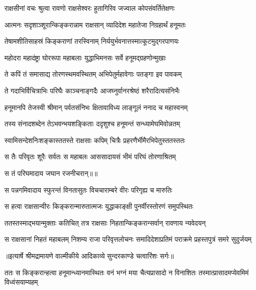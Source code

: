 \twolineshloka
{राक्षसीनां वचः श्रुत्वा रावणो राक्षसेश्वरः}
{हुतागिरिव जज्वाल कोपसंवर्तितेक्षणः} %

\twolineshloka
{आत्मनः सदृशाञ्शूरान्किङ्करान्नाम राक्षसान्}
{व्यादिदेश महातेजा निग्रहार्थं हनूमतः} %

\twolineshloka
{तेषामशीतिसाहस्रं किङ्कराणां तरस्विनाम्}
{निर्ययुर्भवनात्तस्मात्कूटमुद्गरपाणयः} %

\twolineshloka
{महोदरा महादंष्ट्रा घोररूपा महाबलाः}
{युद्धाभिमनसः सर्वे हनूमद्ग्रहणोन्मुखाः} %

\twolineshloka
{ते कपिं तं समासाद्य तोरणस्थमवस्थितम्}
{अभिपेतुर्महावेगाः पतङ्गा इव पावकम्} %

\twolineshloka
{ते गदाभिर्विचित्राभिः परिघैः काञ्चनाङ्गदैः}
{आजघ्नुर्वानरश्रेष्ठं शरैरादित्यसंनिभैः} %

\twolineshloka
{हनूमानपि तेजस्वी श्रीमान् पर्वतसंनिभः}
{क्षितावाविध्य लाङ्गूलं ननाद च महास्वनम्} %

\twolineshloka
{तस्य संनादशब्देन तेऽभवन्भयशङ्किताः}
{ददृशुश्च हनूमन्तं सन्ध्यामेघमिवोन्नतम्} %

\twolineshloka
{स्वामिसन्देशनिःशङ्कास्ततस्ते राक्षसाः कपिम्}
{चित्रैः प्रहरणैर्भीमैरभिपेतुस्ततस्ततः} %

\twolineshloka
{स तैः परिवृतः शूरैः सर्वतः स महाबलः}
{आससादायसं भीमं परिघं तोरणाश्रितम्} %

{स तं परिघमादाय जघान रजनीचरान्॥॥} %

\addtocounter{shlokacount}{1}

\twolineshloka
{स पन्नगमिवादाय स्फुरन्तं विनतासुतः}
{विचचाराम्बरे वीरः परिगृह्य च मारुतिः} %

\twolineshloka
{स हत्वा राक्षसान्वीरः किङ्करान्मारुतात्मजः}
{युद्धाकाङ्क्षी पुनर्वीरस्तोरणं समुपस्थितः} %

\twolineshloka
{ततस्तस्माद्भयान्मुक्ताः कतिचित् तत्र राक्षसाः}
{निहतान्किङ्करान्सर्वान् रावणाय न्यवेदयन्} %

\fourlineindentedshloka
{स राक्षसानां निहतं महाबलम्}
{निशम्य राजा परिवृत्तलोचनः}
{समादिदेशाप्रतिमं पराक्रमे}
{प्रहस्तपुत्रं समरे सुदुर्जयम्} %


{॥इत्यार्षे श्रीमद्रामायणे वाल्मीकीये आदिकाव्ये सुन्दरकाण्डे चत्वारिंशः सर्गः॥}


\threelineshloka
{ततः स किङ्करान्हत्वा हनूमान्ध्यानमास्थितः}
{वनं भग्नं मया चैत्यप्रासादो न विनाशितः}
{तस्मात्प्रासादमप्येवमिमं विध्वंसयाम्यहम्} %

